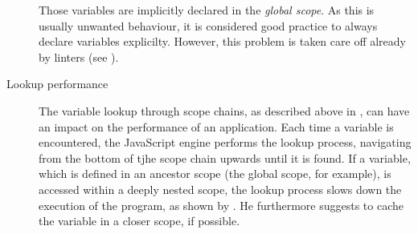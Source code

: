 \begin{description}
Those variables are implicitly declared in the \emph{global scope}. As
this is usually unwanted behaviour, it is considered good practice to
always declare variables explicilty. However, this problem is taken care
off already by linters (see ).
\item[Lookup performance]
The variable lookup through scope chains, as described above in
, can have an impact on the
performance of an application. Each time a variable is encountered, the
JavaScript engine performs the lookup process, navigating from the
bottom of tjhe scope chain upwards until it is found. If a variable,
which is defined in an ancestor scope (the global scope, for example),
is accessed within a deeply nested scope, the lookup process slows down
the execution of the program, as shown by . He
furthermore suggests to cache the variable in a closer scope, if
possible.
\end{description}
